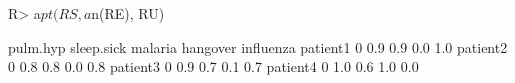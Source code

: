 \begin{Schunk}
% --begin: "comp.circ.excl.unavoid"
\begin{Sinput}
R> a$pt(RS, a$n(RE), RU)
\end{Sinput}
\begin{Soutput}
         pulm.hyp sleep.sick malaria hangover influenza
patient1        0        0.9     0.9      0.0       1.0
patient2        0        0.8     0.8      0.0       0.8
patient3        0        0.9     0.7      0.1       0.7
patient4        0        1.0     0.6      1.0       0.0
\end{Soutput}
%
% --end: "comp.circ.excl.unavoid"
\end{Schunk}
